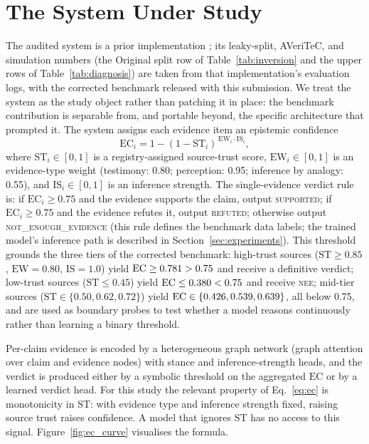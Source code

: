 \documentclass[11pt]{article}
\begin{document}
\section{The System Under Study}
\label{sec:system}
The audited system is a prior implementation \citep{anonymous2026system}; its leaky-split, AVeriTeC, and simulation numbers (the Original split row of Table~\ref{tab:inversion} and the upper rows of Table~\ref{tab:diagnosis}) are taken from that implementation's evaluation logs, with the corrected benchmark released with this submission. We treat the system as the study object rather than patching it in place: the benchmark contribution is separable from, and portable beyond, the specific architecture that prompted it. The system assigns each evidence item an epistemic confidence
\begin{equation}
\mathrm{EC}_i = 1 - (1 - \mathrm{ST}_i)^{\,\mathrm{EW}_i \cdot \mathrm{IS}_i},
\label{eq:ec}
\end{equation}
where $\mathrm{ST}_i \in [0,1]$ is a registry-assigned source-trust score, $\mathrm{EW}_i \in [0,1]$ is an evidence-type weight (testimony: 0.80; perception: 0.95; inference by analogy: 0.55), and $\mathrm{IS}_i \in [0,1]$ is an inference strength. The single-evidence verdict rule is: if $\mathrm{EC}_i \geq 0.75$ and the evidence supports the claim, output \textsc{supported}; if $\mathrm{EC}_i \geq 0.75$ and the evidence refutes it, output \textsc{refuted}; otherwise output \textsc{not\_enough\_evidence} (this rule defines the benchmark data labels; the trained model's inference path is described in Section~\ref{sec:experiments}). This threshold grounds the three tiers of the corrected benchmark: high-trust sources ($\mathrm{ST}\geq 0.85$, $\mathrm{EW}=0.80$, $\mathrm{IS}=1.0$) yield $\mathrm{EC}\geq 0.781>0.75$ and receive a definitive verdict; low-trust sources ($\mathrm{ST}\leq 0.45$) yield $\mathrm{EC}\leq 0.380<0.75$ and receive \textsc{nee}; mid-tier sources ($\mathrm{ST}\in\{0.50,0.62,0.72\}$) yield $\mathrm{EC}\in\{0.426,0.539,0.639\}$, all below 0.75, and are used as boundary probes to test whether a model reasons continuously rather than learning a binary threshold.

Per-claim evidence is encoded by a heterogeneous graph network \citep{schlichtkrull2018rgcn} (graph attention \citep{velickovic2018gat} over claim and evidence nodes) with stance and inference-strength heads, and the verdict is produced either by a symbolic threshold on the aggregated $\mathrm{EC}$ or by a learned verdict head. For this study the relevant property of Eq.~\eqref{eq:ec} is monotonicity in $\mathrm{ST}$: with evidence type and inference strength fixed, raising source trust raises confidence. A model that ignores $\mathrm{ST}$ has no access to this signal. Figure~\ref{fig:ec_curve} visualises the formula.
\end{document}
